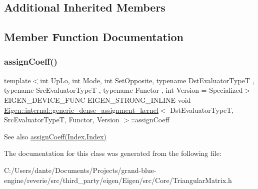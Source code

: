 \subsection*{Additional Inherited Members}


\subsection{Member Function Documentation}
\mbox{\label{class_eigen_1_1internal_1_1triangular__dense__assignment__kernel_a9f36120222600d1d843b4253b08a383b}} 
\subsubsection{\texorpdfstring{assignCoeff()}{assignCoeff()}}
{\footnotesize\ttfamily template$<$int Up\+Lo, int Mode, int Set\+Opposite, typename Dst\+Evaluator\+TypeT , typename Src\+Evaluator\+TypeT , typename Functor , int Version = Specialized$>$ \\
E\+I\+G\+E\+N\+\_\+\+D\+E\+V\+I\+C\+E\+\_\+\+F\+U\+NC E\+I\+G\+E\+N\+\_\+\+S\+T\+R\+O\+N\+G\+\_\+\+I\+N\+L\+I\+NE void \mbox{\hyperlink{class_eigen_1_1internal_1_1generic__dense__assignment__kernel}{Eigen\+::internal\+::generic\+\_\+dense\+\_\+assignment\+\_\+kernel}}$<$ Dst\+Evaluator\+TypeT, Src\+Evaluator\+TypeT, Functor, Version $>$\+::assign\+Coeff\hspace{0.3cm}{\ttfamily [inline]}}

\begin{DoxySeeAlso}{See also}
\mbox{\hyperlink{class_eigen_1_1internal_1_1generic__dense__assignment__kernel_a7ca974cc4049f1ef3d6f2feac94ea35b}{assign\+Coeff(\+Index,\+Index)}} 
\end{DoxySeeAlso}


The documentation for this class was generated from the following file\+:\begin{DoxyCompactItemize}
\item 
C\+:/\+Users/dante/\+Documents/\+Projects/grand-\/blue-\/engine/reverie/src/third\+\_\+party/eigen/\+Eigen/src/\+Core/Triangular\+Matrix.\+h\end{DoxyCompactItemize}
